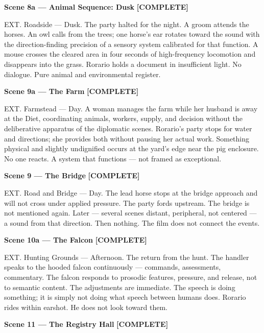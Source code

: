 \documentclass[12pt, oneside]{amsart}
\newcommand{\statuscomplete}{{\small\bfseries\color{complete}[COMPLETE]}}
\begin{document}
\bigskip

\noindent\textbf{Scene 8a --- Animal Sequence: Dusk} \statuscomplete

\noindent EXT. Roadside --- Dusk. The party halted for the night. A groom attends the horses. An owl calls from the trees; one horse's ear rotates toward the sound with the direction-finding precision of a sensory system calibrated for that function. A mouse crosses the cleared area in four seconds of high-frequency locomotion and disappears into the grass. Rorario holds a document in insufficient light. No dialogue. Pure animal and environmental register.

\bigskip

\noindent\textbf{Scene 9a --- The Farm} \statuscomplete

\noindent EXT. Farmstead --- Day. A woman manages the farm while her husband is away at the Diet, coordinating animals, workers, supply, and decision without the deliberative apparatus of the diplomatic scenes. Rorario's party stops for water and directions; she provides both without pausing her actual work. Something physical and slightly undignified occurs at the yard's edge near the pig enclosure. No one reacts. A system that functions --- not framed as exceptional.

\bigskip

\noindent\textbf{Scene 9 --- The Bridge} \statuscomplete

\noindent EXT. Road and Bridge --- Day. The lead horse stops at the bridge approach and will not cross under applied pressure. The party fords upstream. The bridge is not mentioned again. Later --- several scenes distant, peripheral, not centered --- a sound from that direction. Then nothing. The film does not connect the events.

\bigskip

\noindent\textbf{Scene 10a --- The Falcon} \statuscomplete

\noindent EXT. Hunting Grounds --- Afternoon. The return from the hunt. The handler speaks to the hooded falcon continuously --- commands, assessments, commentary. The falcon responds to prosodic features, pressure, and release, not to semantic content. The adjustments are immediate. The speech is doing something; it is simply not doing what speech between humans does. Rorario rides within earshot. He does not look toward them.

\bigskip

\noindent\textbf{Scene 11 --- The Registry Hall} \statuscomplete
\end{document}
